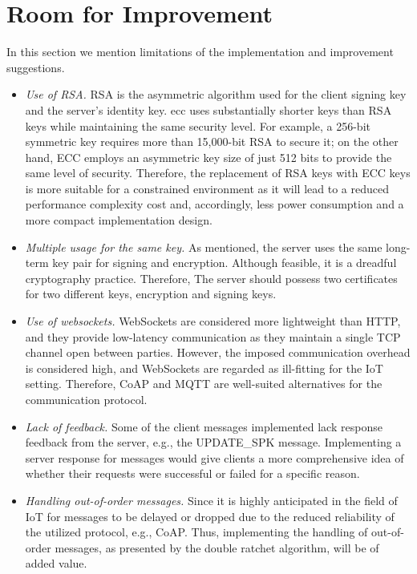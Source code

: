 \section{Room for Improvement}
In this section we mention limitations of the implementation and improvement suggestions.
\begin{itemize}
	\item \textit{Use of RSA.} RSA is the asymmetric algorithm used for the client signing key and the server's identity key. \gls{ecc} uses substantially shorter keys than RSA keys while maintaining the same security level. For example, a 256-bit symmetric key requires more than 15,000-bit RSA to secure it; on the other hand, ECC employs an asymmetric key size of just 512 bits to provide the same level of security. Therefore, the replacement of RSA keys with ECC keys is more suitable for a constrained environment as it will lead to a reduced performance complexity cost and, accordingly, less power consumption and a more compact implementation design.
	\item \textit{Multiple usage for the same key.} As mentioned, the server uses the same long-term key pair for signing and encryption. Although feasible, it is a dreadful cryptography practice. Therefore, The server should possess two certificates for two different keys, encryption and signing keys.
	\item \textit{Use of websockets.} WebSockets are considered more lightweight than HTTP, and they provide low-latency communication as they maintain a single TCP channel open between parties. However, the imposed communication overhead is considered high, and WebSockets are regarded as ill-fitting for the IoT setting. Therefore, CoAP and MQTT are well-suited alternatives for the communication protocol.
	\item \textit{Lack of feedback.} Some of the client messages implemented lack response feedback from the server, e.g., the UPDATE\_SPK message. Implementing a server response for messages would give clients a more comprehensive idea of whether their requests were successful or failed for a specific reason.
	\item \textit{Handling out-of-order messages.} Since it is highly anticipated in the field of IoT for messages to be delayed or dropped due to the reduced reliability of the utilized protocol, e.g., CoAP. Thus, implementing the handling of out-of-order messages, as presented by the double ratchet algorithm, will be of added value. 
\end{itemize}


